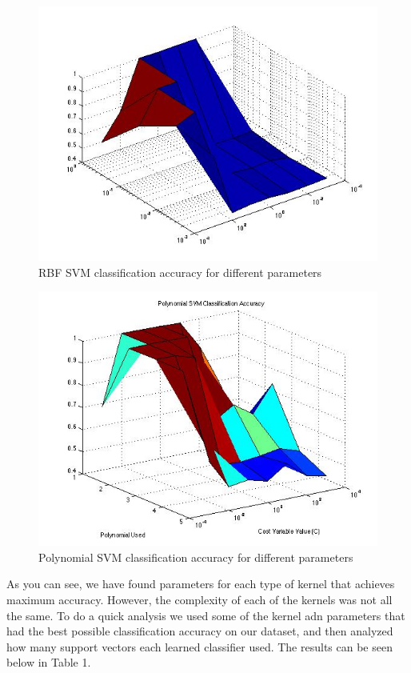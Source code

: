 \documentclass[paper=a4, fontsize=11pt]{scrartcl} %
\begin{document}
\begin{figure}
\centering
\includegraphics[scale=0.4]{RBF2.jpg}
\caption{RBF SVM classification accuracy for different parameters}
\label{fig:plot_2d}
\end{figure}

\begin{figure}
\centering
\includegraphics[scale=0.4]{Ploy.jpg}
\caption{Polynomial SVM classification accuracy for different parameters }
\label{fig:plot_2d}
\end{figure}

As you can see, we have found parameters for each type of kernel that achieves maximum accuracy. 
However, the complexity of each of the kernels was not all the same.  
To do a quick analysis we used some of the kernel adn parameters that had the best possible classification accuracy on our dataset, and then analyzed how many support vectors each learned classifier used.
The results can be seen below in Table 1.
\end{document}

